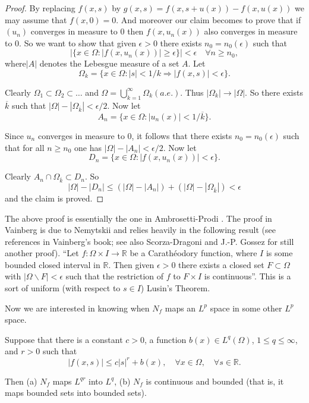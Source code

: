\begin{proof}
By replacing $f(x,s)$ by $g(x,s)=f(x,s+u(x))-f(x,u(x))$ we may assume
that $f(x,0)=0$. And moreover our claim becomes to prove that if
$(u_{n})$ converges in measure to $0$ then $f(x,u_{n}(x))$ also
converges in measure to $0$. So we want to show that given
$\epsilon>0$ there exists $n_{0}=n_{0}(\epsilon)$ such that
$$
|\{x\in \Omega:|f(x,u_{n}(x))|\geq \epsilon\}|<\epsilon\quad \forall
n\geq n_{0},
$$
where\pageoriginale $|A|$ denotes the Lebesgue measure of a set
$A$. Let
$$
\Omega_{k}=\{x\in \Omega:|s|<1/k\Rightarrow |f(x,s)|<\epsilon\}.
$$

Clearly $\Omega_{1}\subset \Omega_{2}\subset\ldots$ and
$\Omega=\bigcup\limits^{\infty}_{k=1}\Omega_{k}(a.e.)$. Thus
$|\Omega_{k}|\to |\Omega|$. So there exists $\overline{k}$ such that
$|\Omega|-|\Omega_{\overline{k}}|<\epsilon/2$. Now let
$$
A_{n}=\{x\in \Omega:|u_{n}(x)|<1/\overline{k}\}.
$$

Since $u_{n}$ converges in measure to $0$, it follows that there
exists $n_{0}=n_{0}(\epsilon)$ such that for all $n\geq n_{0}$ one has
$|\Omega|-|A_{n}|<\epsilon/2$. Now let
$$
D_{n}=\{x\in \Omega:|f(x,u_{n}(x))|<\epsilon\}.
$$

Clearly $A_{n}\cap \Omega_{\overline{k}}\subset D_{n}$. So
$$
|\Omega|-|D_{n}|\leq
(|\Omega|-|A_{n}|)+(|\Omega|-|\Omega_{\overline{k}}|)<\epsilon 
$$
and the claim is proved.
\end{proof}

\begin{remark*}
The above proof is essentially the one in Ambrosetti-Prodi
\cite{key2}. The proof in Vainberg \cite{key78} is due to Nemytskii
and relies heavily in the following result (see references in
Vainberg's book; see also Scorza-Dragoni \cite{key74} and J.-P. Gossez
\cite{key47} for still another proof). ``Let $f:\Omega\times I\to
\mathbb{R}$ be a Carath\'eodory function, where $I$ is some bounded
closed interval in $\mathbb{R}$. Then given $\epsilon>0$ there exists
a closed set $F\subset \Omega$ with $|\Omega\backslash F|<\epsilon$
such that the restriction of $f$ to $F\times I$ is continuous''. This
is a sort of uniform (with respect to $s\in I$) Lusin's Theorem.
\end{remark*}

Now we are interested in knowing when $N_{f}$ maps an $L^{p}$ space in
some other $L^{p}$ space.

\begin{theorem}\label{chap2-thm2.3}
Suppose that there is a constant $c>0$, a function $b(x)\in
L^{q}(\Omega)$, $1\leq q\leq \infty$, and $r>0$ such that
\begin{equation*}
|f(x,s)|\leq c|s|^{r}+b(x),\quad \forall x\in \Omega,\quad \forall
s\in \mathbb{R}.\tag{2.1}\label{chap2-eq2.1} 
\end{equation*}

Then {\rm(a)} $N_{f}$ maps $L^{qr}$ into $L^{q}$, {\rm(b)} $N_{f}$ is
continuous and bounded (that is, it maps bounded sets into bounded sets).
\end{theorem}

